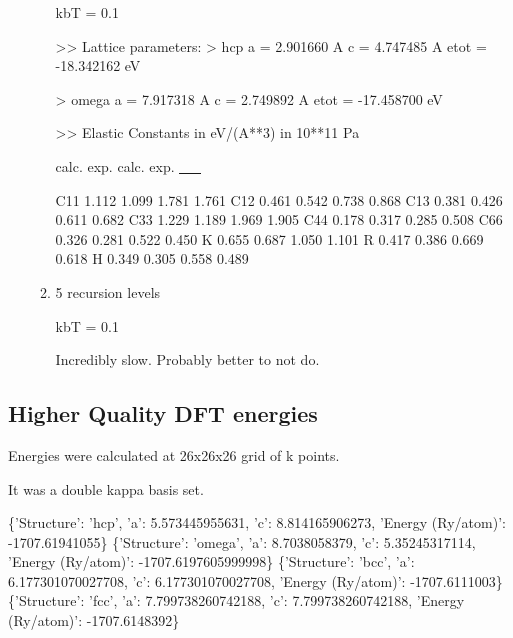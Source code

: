 \documentclass[11pt]{article}
\begin{document}
\begin{enumerate}
\begin{enumerate}
kbT = 0.1

>> Lattice parameters:
   > hcp
         a =  2.901660 A
         c =  4.747485 A
      etot = -18.342162 eV

> omega
      a =  7.917318 A
      c =  2.749892 A
   etot = -17.458700 eV

>> Elastic Constants
                  in eV/(A**3)            in 10**11 Pa

calc.      exp.          calc.      exp.
\uline{\uline{\uline{\uline{\uline{\uline{\uline{\uline{\uline{\uline{\uline{\uline{\uline{\uline{\uline{\uline{\uline{\uline{\uline{\uline{\uline{\uline{\uline{\uline{\uline{\uline{\uline{\uline{\uline{\uline{\_\_}}}}}}}}}}}}}}}}}}}}}}}}}}}}}}


C11         1.112      1.099         1.781      1.761
C12         0.461      0.542         0.738      0.868
C13         0.381      0.426         0.611      0.682
C33         1.229      1.189         1.969      1.905
C44         0.178      0.317         0.285      0.508
C66         0.326      0.281         0.522      0.450
 K          0.655      0.687         1.050      1.101
 R          0.417      0.386         0.669      0.618
 H          0.349      0.305         0.558      0.489

\item 5 recursion levels
\label{sec:org21a85c9}

kbT = 0.1

Incredibly slow. Probably better to not do.
\end{enumerate}
\end{enumerate}





\subsection{Higher Quality DFT energies}
\label{sec:org157f6a5}

Energies were calculated at 26x26x26 grid of k points.

It was a double kappa basis set. 

\{'Structure': 'hcp', 'a': 5.573445955631, 'c': 8.814165906273, 'Energy (Ry/atom)': -1707.61941055\}
\{'Structure': 'omega', 'a': 8.7038058379, 'c': 5.35245317114, 'Energy (Ry/atom)': -1707.6197605999998\}
\{'Structure': 'bcc', 'a': 6.177301070027708, 'c': 6.177301070027708, 'Energy (Ry/atom)': -1707.6111003\}
\{'Structure': 'fcc', 'a': 7.799738260742188, 'c': 7.799738260742188, 'Energy (Ry/atom)': -1707.6148392\}
\end{document}
